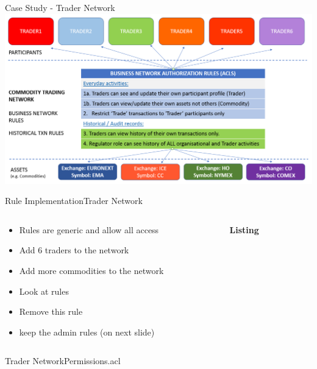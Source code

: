 \documentclass[pdf,table]{beamer}
\begin{document}
\begin{frame}{Case Study - Trader Network}
	\includegraphics[scale=0.3]{trader}
\end{frame}

\begin{frame}[fragile]{Rule Implementation}{Trader Network}
	\begin{columns}[T]
		\begin{column}{0.48\textwidth}
			\begin{itemize}
				\item Rules are generic and allow all access
				\item Add 6 traders to the network
				\item Add more commodities to the network
				\item Look at rules
				\item Remove this rule
				\item keep the admin rules (on next slide)
			\end{itemize}	
		\end{column}
		\begin{column}{0.48\textwidth}
			{\bf Listing}
			
		\end{column}
	\end{columns}	
\end{frame}

\begin{frame}{Trader Network}{Permissions.acl}
	
\end{frame}
\end{document}
